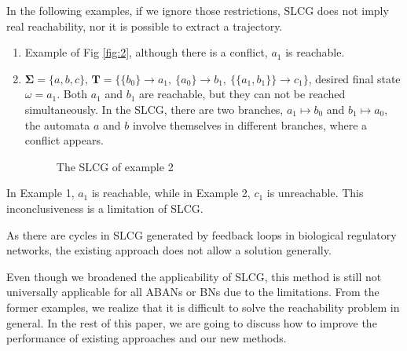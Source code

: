 \documentclass[runningheads]{llncs}
\newcommand{\acm}[3]{\{#1\}\rightarrow#3}
\begin{document}
In the following examples, if we ignore those restrictions, SLCG does not imply real reachability, nor it is possible to extract a trajectory.

\begin{enumerate}
\item Example of %
Fig \ref{fig:2}, although there is a conflict, $a_1$ is reachable.
\item $\mathbf{\Sigma}=\{a,b,c\}$, $\mathbf{T}=\{\acm{b_0}{a_0}{a_1},\ \acm{a_0}{b_0}{b_1},\ \acm{\{a_1,b_1\}}{c_0}{c_1}\}$,  desired final state $\omega=a_1$. 
Both $a_1$ and $b_1$ are reachable, but they can not be reached simultaneously.
In the SLCG, there are two branches, $a_1\mapsto b_0$ and $b_1\mapsto a_0$, the automata $a$ and $b$ involve themselves in different branches, where a conflict appears.
\begin{figure}[ht]
\centering

\caption{The SLCG of example 2}
\label{fig:3}
\end{figure}
%

\end{enumerate}

In Example 1, $a_1$ is reachable, while in Example 2, $c_1$ is unreachable. This inconclusiveness is a limitation of SLCG.

As there are cycles in SLCG generated by feedback loops in biological regulatory networks, the existing approach does not allow a solution generally.

Even though we broadened the applicability of SLCG, this method is still not universally applicable for all ABANs or BNs due to the limitations. From the former examples, we realize that it is difficult to solve the reachability problem in general. 
In the rest of this paper, we are going to discuss how to improve the performance of existing approaches and our new methods. 
\end{document}
